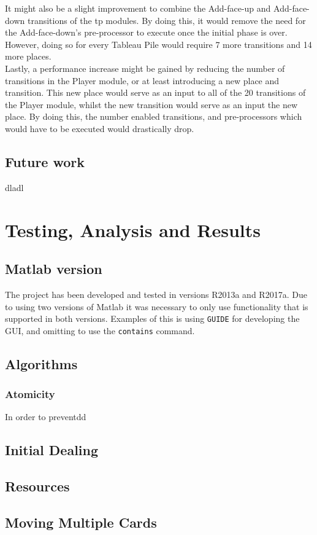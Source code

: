 \documentclass[runningheads,a4paper]{llncs}
\begin{document}
It might also be a slight improvement to combine the Add-face-up and Add-face-down transitions of the \ac{tp} modules. By doing this, it would remove the need for the Add-face-down's pre-processor to execute once the initial phase is over. However, doing so for every Tableau Pile would require 7 more transitions and 14 more places. \\

Lastly, a performance increase might be gained by reducing the number of transitions in the Player module, or at least introducing a new place and transition. This new place would serve as an input to all of the 20 transitions of the Player module, whilst the new transition would serve as an input the new place. By doing this, the number enabled transitions, and pre-processors which would have to be executed would drastically drop.
\clearpage
\subsection{Future work}
dladl
\section{Testing, Analysis and Results}
\subsection{Matlab version}
The project has been developed and tested in versions R2013a and R2017a. Due to using two versions of Matlab it was necessary to only use functionality that is supported in both versions. Examples of this is using \verb!GUIDE! for developing the GUI, and omitting to use the \verb!contains! command.
\label{sec:3_testing_analysis}
\subsection{Algorithms}
\subsubsection{Atomicity}
In order to preventdd
\subsection{Initial Dealing}
\label{sec:3_initial_dealing}
\subsection{Resources}
\subsection{Moving Multiple Cards}
\end{document}
